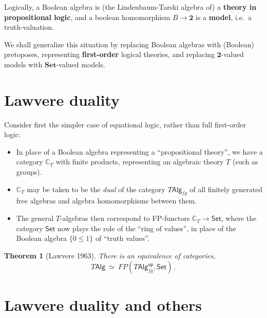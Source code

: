 \documentclass[11pt]{article}
\newcommand{\Set}{\ensuremath{\mathsf{Set}}}
\newtheorem{theorem}{Theorem}
\theoremstyle{remark}
\theoremstyle{definition}
\newcommand{\myemph}[1]{\textbf{#1}}
\begin{document}
Logically, a Boolean algebra is (the Lindenbaum-Tarski algebra of) a \myemph{theory in propositional logic}, and a boolean homomorphism $B\to \mathbf{2}$ is a \myemph{model}, i.e.\ a truth-valuation.
\medskip

We shall generalize this situation by replacing Boolean algebras with (Boolean) pretoposes, representing \myemph{first-order} logical theories, and replacing $\mathbf{2}$-valued models with $\mathbf{Set}$-valued models.

\section{Lawvere duality}

Consider first the simpler case of equational logic, rather than full first-order logic:
\begin{itemize}

\item In place of a Boolean algebra representing a ``propositional theory'', we have a category $\mathbb{C}_T$ with finite products, representing an algebraic theory $T$ (such as groups). 

\item $\mathbb{C}_T$ may be taken to be the \emph{dual}  of the category $T\mathsf{Alg}_{fg}$ of all finitely generated free algebras and algebra homomorphisms between them.


\item The general $T$-algebras then correspond to FP-functors $\mathbb{C}_T \to \Set$, where the category $\Set$ now plays the role of the ``ring of values'', in place of the Boolean algebra $\{ 0 \leq 1\}$ of ``truth values''. 
\end{itemize}


\begin{theorem}[Lawvere 1963]
There is an equivalence of categories,
\[
T\mathsf{Alg}\ \simeq\ FP(T\mathsf{Alg}_{fg}^\mathsf{op}, \Set)\,.
\]
\end{theorem}

\section{Lawvere duality and others}
\end{document}
